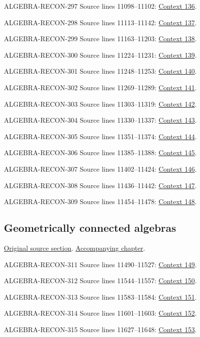\begin{AlgebraSourceRoutes}
\item[ALGEBRA-RECON-297] Source lines 11098--11102: \hyperlink{algebra-context-136}{Context 136}.
\item[ALGEBRA-RECON-298] Source lines 11113--11142: \hyperlink{algebra-context-137}{Context 137}.
\item[ALGEBRA-RECON-299] Source lines 11163--11203: \hyperlink{algebra-context-138}{Context 138}.
\item[ALGEBRA-RECON-300] Source lines 11224--11231: \hyperlink{algebra-context-139}{Context 139}.
\item[ALGEBRA-RECON-301] Source lines 11248--11253: \hyperlink{algebra-context-140}{Context 140}.
\item[ALGEBRA-RECON-302] Source lines 11269--11289: \hyperlink{algebra-context-141}{Context 141}.
\item[ALGEBRA-RECON-303] Source lines 11303--11319: \hyperlink{algebra-context-142}{Context 142}.
\item[ALGEBRA-RECON-304] Source lines 11330--11337: \hyperlink{algebra-context-143}{Context 143}.
\item[ALGEBRA-RECON-305] Source lines 11351--11374: \hyperlink{algebra-context-144}{Context 144}.
\item[ALGEBRA-RECON-306] Source lines 11385--11388: \hyperlink{algebra-context-145}{Context 145}.
\item[ALGEBRA-RECON-307] Source lines 11402--11424: \hyperlink{algebra-context-146}{Context 146}.
\item[ALGEBRA-RECON-308] Source lines 11436--11442: \hyperlink{algebra-context-147}{Context 147}.
\item[ALGEBRA-RECON-309] Source lines 11454--11478: \hyperlink{algebra-context-148}{Context 148}.
\end{AlgebraSourceRoutes}

\subsection{Geometrically connected algebras}
\hypertarget{algebra-source-section-geometrically-connected}{}
\noindent\href{https://github.com/stacks/stacks-project/blob/a04446e57ec1fbc252a871afcec7752fb2807b14/algebra.tex\#L11484}{Original source section}. \href{algebra.pdf\#nameddest=section-geometrically-connected}{Accompanying chapter}.

\begin{AlgebraSourceRoutes}
\item[ALGEBRA-RECON-311] Source lines 11490--11527: \hyperlink{algebra-context-149}{Context 149}.
\item[ALGEBRA-RECON-312] Source lines 11544--11557: \hyperlink{algebra-context-150}{Context 150}.
\item[ALGEBRA-RECON-313] Source lines 11583--11584: \hyperlink{algebra-context-151}{Context 151}.
\item[ALGEBRA-RECON-314] Source lines 11601--11603: \hyperlink{algebra-context-152}{Context 152}.
\item[ALGEBRA-RECON-315] Source lines 11627--11648: \hyperlink{algebra-context-153}{Context 153}.
\end{AlgebraSourceRoutes}

